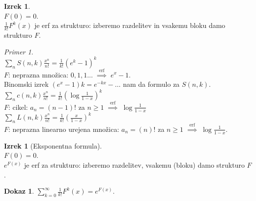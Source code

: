 \documentclass[a4paper, 12pt]{book}
\theoremstyle{definition}
\newtheorem{theorem}[counter]{Izrek}
\newtheorem{pro}[counter]{Dokaz}
\theoremstyle{remark}
\newtheorem*{ex}{Primer}
\begin{document}
\begin{theorem} \text{} \\
  $F(0) = 0$. \\
  $\frac{1}{k!} F^k(x)$ je erf za strukturo: izberemo razdelitev in vsakemu bloku damo strukturo $F$.
\end{theorem}
\begin{ex} \text{} \\
  $\sum_n S(n,k) \frac{x^n}{n!} = \frac{1}{k!} (e^k-1)^k$ \\
  $F$: neprazna množica: $0,1,1 \dots \; \stackrel{\text{erf}}{\implies} \; e^x-1$. \\
  Binomski izrek $(e^x-1)k = e^{-kx} - \dots$ nam da formulo za $S(n,k)$. \\
  $\sum_n c(n,k) \frac{x^n}{n!} = \frac{1}{k!} \left(\log \frac{1}{1-x}\right)^k$ \\
  $F$: cikel: $a_n = (n-1)!$ za $n \geq 1 \; \stackrel{\text{erf}}{\implies} \; \log \frac{1}{1-x}$ \\
  $\sum_n L(n,k) \frac{x^n}{n!} = \frac{1}{k!} \left(\frac{x}{1-x}\right)^k$ \\
  $F$: neprazna linearno urejena množica:
  $a_n = (n)!$ za $n \geq 1 \; \stackrel{\text{erf}}{\implies} \; \log \frac{1}{1-x}$. \\
\end{ex}
\begin{theorem}[Eksponentna formula] \text{} \\
  $F(0) = 0$. \\
  $e^{F(x)}$ je erf za strukturo: izberemo razdelitev, vsakemu (bloku) damo strukturo $F$.
\end{theorem}
\begin{pro}
  $\sum_{k=0}^{\infty} \frac{1}{k!} F^k(x) = e^{F(x)}$.
\end{pro}
\end{document}
